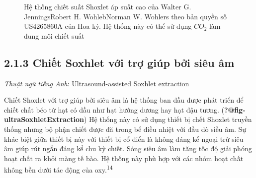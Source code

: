 \documentclass[
  twocolumn,
  landscape]{report}
\begin{document}
\begin{figure}


\caption{\label{fig-HighpressureShoxletExtractor}Hệ thống chiết suất
Shoxlet áp suất cao của Walter G. JenningsRobert H. WohlebNorman W.
Wohlers theo bản quyền số US4265860A của Hoa kỳ. Hệ thống này có thể sử
dụng \(CO_2\) làm dung môi chiết suất}

\end{figure}%

\subsection{2.1.3 Chiết Soxhlet với trợ giúp bởi siêu
âm}\label{chiux1ebft-soxhlet-vux1edbi-trux1ee3-giuxfap-bux1edfi-siuxeau-uxe2m}

\emph{Thuật ngữ tiếng Anh}: Ultrasound-assisted Soxhlet extraction

Chiết Shoxlet với trợ giúp bởi siêu âm là hệ thống ban đầu được phát
triển để chiết chất béo từ hạt có dầu như hạt hướng dương hay hạt đậu
tương. (\textbf{?@fig-ultraSoxhletExtraction}) Hệ thống này có sử dụng
thiết bị chết Shoxlet truyền thống nhưng bộ phận chiết được đă trong bể
điều nhiệt với đầu dò siều âm. Sự khác biệt giữa thiết bị này với thiết
bị cổ điển là không đáng kể ngoại trừ siêu âm giúp rút ngắn đáng kể chu
kỳ chiết. Sóng siêu âm làm tăng tốc độ giải phóng hoạt chất ra khỏi màng
tế bào. Hệ thống này phù hợp với các nhóm hoạt chất không bền dưới tác
động của oxy.\textsuperscript{14}
\end{document}
